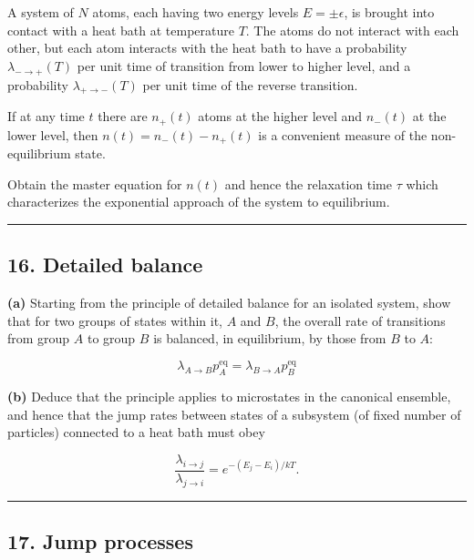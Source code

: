 \documentclass[
  letterpaper,
  DIV=11,
  numbers=noendperiod]{scrreprt}
\begin{document}
A system of \(N\) atoms, each having two energy levels
\(E = \pm \epsilon\), is brought into contact with a heat bath at
temperature \(T\). The atoms do not interact with each other, but each
atom interacts with the heat bath to have a probability
\(\lambda_{-\to+}(T)\) per unit time of transition from lower to higher
level, and a probability \(\lambda_{+\to-}(T)\) per unit time of the
reverse transition.

If at any time \(t\) there are \(n_+(t)\) atoms at the higher level and
\(n_-(t)\) at the lower level, then \(n(t) = n_-(t) - n_+(t)\) is a
convenient measure of the non-equilibrium state.

Obtain the master equation for \(n(t)\) and hence the relaxation time
\(\tau\) which characterizes the exponential approach of the system to
equilibrium.

\begin{center}\rule{0.5\linewidth}{0.5pt}\end{center}

\subsection*{16. Detailed balance}\label{detailed-balance}

\textbf{(a)} Starting from the principle of detailed balance for an
isolated system, show that for two groups of states within it, \(A\) and
\(B\), the overall rate of transitions from group \(A\) to group \(B\)
is balanced, in equilibrium, by those from \(B\) to \(A\):

\[
\lambda_{A \to B} p^{\text{eq}}_A = \lambda_{B \to A} p^{\text{eq}}_B
\]

\textbf{(b)} Deduce that the principle applies to microstates in the
canonical ensemble, and hence that the jump rates between states of a
subsystem (of fixed number of particles) connected to a heat bath must
obey

\[
\frac{\lambda_{i \to j}}{\lambda_{j \to i}} = e^{-(E_j - E_i)/kT}.
\]

\begin{center}\rule{0.5\linewidth}{0.5pt}\end{center}

\subsection*{17. Jump processes}\label{jump-processes}
\end{document}
